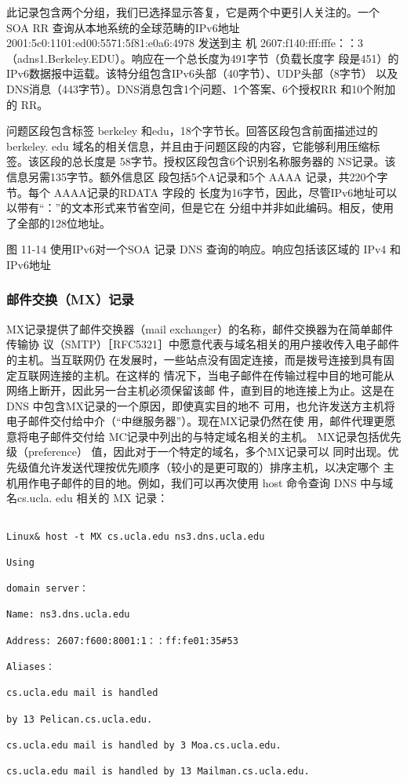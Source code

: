 此记录包含两个分组，我们已选择显示答复，它是两个中更引人关注的。一个 SOA RR
查询从本地系统的全球范畴的IPv6地址2001:5c0:1101:ed00:5571:5f81:e0a6:4978 发送到主
机 2607:f140:fff:fffe：：3 （adns1.Berkeley.EDU）。响应在一个总长度为491字节（负载长度字
段是451）的IPv6数据报中运载。该特分组包含IPv6头部（40字节）、UDP头部（8字节）
以及 DNS消息（443字节）。DNS消息包含1个问题、1个答案、6个授权RR 和10个附加
的 RR。

问题区段包含标签 berkeley 和edu，18个字节长。回答区段包含前面描述过的 berkeley.
edu 域名的相关信息，并且由于问题区段的内容，它能够利用压缩标签。该区段的总长度是
58字节。授权区段包含6个识别名称服务器的 NS记录。该信息另需135字节。额外信息区
段包括5个A记录和5个 AAAA 记录，共220个字节。每个 AAAA记录的RDATA 字段的
长度为16字节，因此，尽管IPv6地址可以以带有“：”的文本形式来节省空间，但是它在
分组中并非如此编码。相反，使用了全部的128位地址。

图 11-14 使用IPv6对一个SOA 记录 DNS 查询的响应。响应包括该区域的 IPv4 和 IPv6地址

\subsubsection{邮件交换（MX）记录}

MX记录提供了邮件交换器（mail exchanger）的名称，邮件交换器为在简单邮件传输协
议（SMTP）［RFC5321］中愿意代表与域名相关的用户接收传入电子邮件的主机。当互联网仍
在发展时，一些站点没有固定连接，而是拨号连接到具有固定互联网连接的主机。在这样的
情况下，当电子邮件在传输过程中目的地可能从网络上断开，因此另一台主机必须保留该邮
件，直到目的地连接上为止。这是在 DNS 中包含MX记录的一个原因，即使真实目的地不
可用，也允许发送方主机将电子邮件交付给中介（“中继服务器”）。现在MX记录仍然在使
用，邮件代理更愿意将电子邮件交付给 MC记录中列出的与特定域名相关的主机。
MX记录包括优先级（preference） 值，因此对于一个特定的域名，多个MX记录可以
同时出现。优先级值允许发送代理按优先顺序（较小的是更可取的）排序主机，以决定哪个
主机用作电子邮件的目的地。例如，我们可以再次使用 host 命令查询 DNS 中与域名cs.ucla.
edu 相关的 MX 记录：

\begin{verbatim}
    
Linux& host -t MX cs.ucla.edu ns3.dns.ucla.edu

Using

domain server：

Name: ns3.dns.ucla.edu

Address: 2607:f600:8001:1：：ff:fe01:35#53

Aliases：

cs.ucla.edu mail is handled

by 13 Pelican.cs.ucla.edu.

cs.ucla.edu mail is handled by 3 Moa.cs.ucla.edu.

cs.ucla.edu mail is handled by 13 Mailman.cs.ucla.edu.
\end{verbatim}

